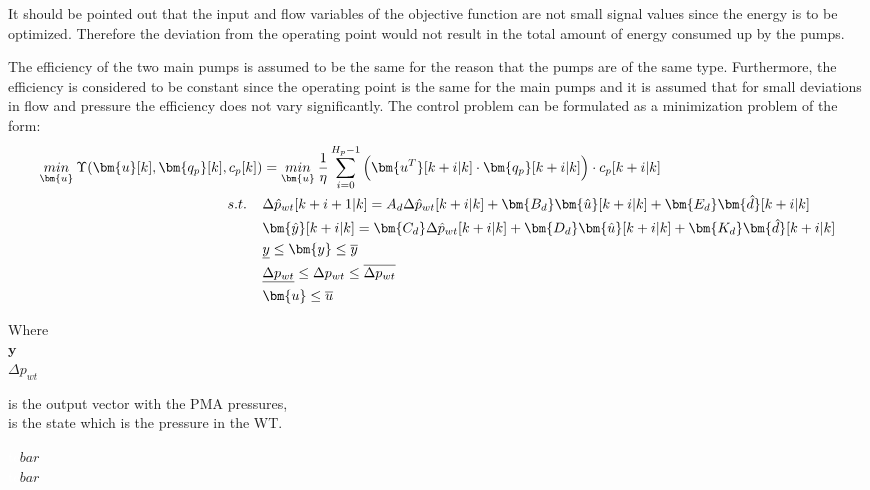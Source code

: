 It should be pointed out that the input and flow variables of the objective function are not small signal values since the energy is to be optimized. Therefore the deviation from the operating point would not result in the total amount of energy consumed up by the pumps. 

The efficiency of the two main pumps is assumed to be the same for the reason that the pumps are of the same type. Furthermore, the efficiency is considered to be constant since the operating point is the same for the main pumps and it is assumed that for small deviations in flow and pressure the efficiency does not vary significantly. 
The control problem can be formulated as a minimization problem of the form:
\begin{align}
\underset{\bm{u}}{min} \:  \Upsilon(\bm{u}[k],\bm{q_p}[k],c_p[k]) &= \underset{\bm{u}}{min} \: \frac{1}{\eta} \sum_{i=0}^{H_p-1} \Big( \bm{u^T}[k+i|k] \cdot \bm{q_{p}}[k+i|k]\Big)\cdot c_p[k+i|k] \label{eqcost1} \\
%
\newline
s.t. \:\:\:\:\: & \Delta \hat{p}_{wt} [k+i+1|k] = A_d \Delta \hat{p}_{wt}[k+i|k]  + \bm{B_d} \bm{\hat{u}}[k+i|k] + \bm{E_d} \bm{\hat{d}}[k+i|k] \label{dyn}  \\ 
%
&\bm{\hat{y}}[k+i|k] = \bm{C_d} \Delta \hat{p}_{wt}[k+i|k] + \bm{D_d} \bm{\hat{u}}[k+i|k] + \bm{K_d} \bm{\hat{d}}[k+i|k] \\
%
& \underline{y} \leq \bm{y} \leq \overline{y} \\
%
& \underline{\Delta p_{wt}} \leq \Delta p_{wt} \leq \overline{\Delta p_{wt}} \\
%
& \bm{u} \leq \overline{u} \label{eqconst2} 
\end{align}

 \begin{minipage}[t]{0.24\textwidth}
 Where\\
 \hspace*{8mm} $\bm{y}$ \\
 \hspace*{8mm} $\Delta p_{wt}$ 
 \end{minipage}
 \begin{minipage}[t]{0.63\textwidth}
 \vspace*{2mm}
 is the output vector with the PMA pressures,\\
 is the state which is the pressure in the WT.
 \end{minipage}
 \begin{minipage}[t]{0.10\textwidth}
 \vspace*{2mm}
 \textcolor{White}{te}$\unit{bar}$\\
 \textcolor{White}{te}$\unit{bar}$
 \end{minipage}

